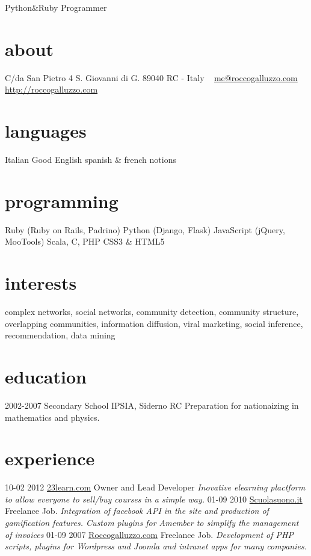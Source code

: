 \documentclass[]{friggeri-cv}
\begin{document}
       {Python\&Ruby Programmer}

\begin{aside}
  \section{about}
    C/da San Pietro 4
    S. Giovanni di G.
    89040 RC - Italy
    ~
    \href{mailto:me@roccogalluzzo.com}{me@roccogalluzzo.com}
    \href{http://roccogalluzzo.com}{http://roccogalluzzo.com}
  \section{languages}
    Italian
    Good English 
    spanish \& french notions
  \section{programming}
    Ruby
    (Ruby on Rails, Padrino)
    Python
    (Django, Flask)
    JavaScript
    (jQuery, MooTools)
    Scala, C, PHP
    CSS3 \& HTML5
\end{aside}

\section{interests}

complex networks, social networks, community detection, community structure,
overlapping communities, information diffusion, viral marketing, social
inference, recommendation, data mining

\section{education}

\begin{entrylist}

  \entry
    {2002-2007}
    {Secondary School}
    {IPSIA, Siderno RC}
    {Preparation for nationaizing in mathematics and physics.}

\end{entrylist}

\section{experience}

\begin{entrylist}
  \entry
    {10-02 2012}
     {\href{http://www.23learn.com}{23learn.com}}
    {Owner and Lead Developer}
    {\emph{Inovative elearning plactform to allow everyone to sell/buy courses in a simple way. }}
  \entry
    {01-09 2010}
    {\href{http://www.scuolasuono.it}{Scuolasuono.it}}
    {Freelance Job.}
    {\emph{Integration of facebook API in the site and production of gamification features. Custom plugins for Amember to simplify the management of invoices}}
  \entry
    {01-09 2007}
    {\href{http://roccogalluzzo.com}{Roccogalluzzo.com}}
    {Freelance Job.}
    {\emph{Development of PHP scripts, plugins for Wordpress and Joomla and intranet apps for many companies.}}
\end{entrylist}
\end{document}
